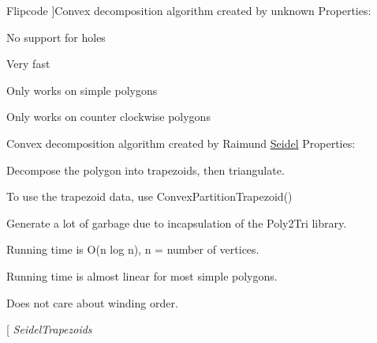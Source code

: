 \begin{Desc}
\begin{description}
{\hypertarget{namespace_farseer_physics_1_1_common_1_1_decomposition_aaf4a6ce83f6797b197ff74a08b9f4575a0efdbf579d7141aad03cab430e30307c}{Flipcode}\label{namespace_farseer_physics_1_1_common_1_1_decomposition_aaf4a6ce83f6797b197ff74a08b9f4575a0efdbf579d7141aad03cab430e30307c}
}]Convex decomposition algorithm created by unknown Properties\+:
\begin{DoxyItemize}
\item No support for holes
\item Very fast
\item Only works on simple polygons
\item Only works on counter clockwise polygons 
\end{DoxyItemize}\item[{\em 
\hypertarget{namespace_farseer_physics_1_1_common_1_1_decomposition_aaf4a6ce83f6797b197ff74a08b9f4575aab178da569507fcd537f712af786ca97}{Seidel}\label{namespace_farseer_physics_1_1_common_1_1_decomposition_aaf4a6ce83f6797b197ff74a08b9f4575aab178da569507fcd537f712af786ca97}
}]Convex decomposition algorithm created by Raimund \hyperlink{namespace_farseer_physics_1_1_common_1_1_decomposition_1_1_seidel}{Seidel} Properties\+:
\begin{DoxyItemize}
\item Decompose the polygon into trapezoids, then triangulate.
\item To use the trapezoid data, use Convex\+Partition\+Trapezoid()
\item Generate a lot of garbage due to incapsulation of the Poly2\+Tri library.
\item Running time is O(n log n), n = number of vertices.
\item Running time is almost linear for most simple polygons.
\item Does not care about winding order. 
\end{DoxyItemize}\item[{\em 
\hypertarget{namespace_farseer_physics_1_1_common_1_1_decomposition_aaf4a6ce83f6797b197ff74a08b9f4575ae998f071c4e86f59551b73d6762c1671}{Seidel\+Trapezoids}\label{namespace_farseer_physics_1_1_common_1_1_decomposition_aaf4a6ce83f6797b197ff74a08b9f4575ae998f071c4e86f59551b73d6762c1671}
}
\end{description}
\end{Desc}
